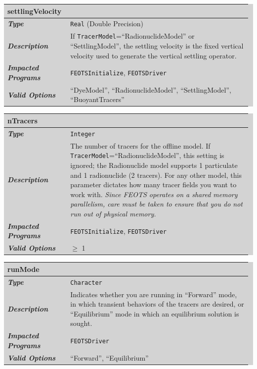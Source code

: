 \documentclass{softwaremanual}
\begin{document}
\noindent\begingroup\setlength{\fboxsep}{0pt}
\colorbox{lightgray}{
\begin{tabular}{p{0.25\linewidth} p{0.725\linewidth}}
\toprule
\textbf{settlingVelocity} & \\
\midrule
\textbf{\textit{Type}} & \texttt{Real} (Double Precision)  \\
\midrule
\textbf{\textit{Description}} & If \texttt{TracerModel}=``RadionuclideModel'' or ``SettlingModel'', the settling velocity is the fixed vertical velocity used to generate the vertical settling operator. \\
\midrule
\textbf{\textit{Impacted Programs}} & \texttt{FEOTSInitialize}, \texttt{FEOTSDriver} \\
\midrule
\textbf{\textit{Valid Options}}  & ``DyeModel'', ``RadionuclideModel'', ``SettlingModel'', ``BuoyantTracers'' \\
\bottomrule
\end{tabular}
}\endgroup


\noindent\begingroup\setlength{\fboxsep}{0pt}
\colorbox{lightgray}{
\begin{tabular}{p{0.25\linewidth} p{0.725\linewidth}}
\toprule
\textbf{nTracers} & \\
\midrule
\textbf{\textit{Type}} & \texttt{Integer} \\
\midrule
\textbf{\textit{Description}} & The number of tracers for the offline model. If \texttt{TracerModel}=``RadionuclideModel'', this setting is ignored; the Radionuclide model supports 1 particulate and 1 radionuclide (2 tracers). For any other model, this parameter dictates how many tracer fields you want to work with. \textit{Since FEOTS operates on a shared memory parallelism, care must be taken to ensure that you do not run out of physical memory.}  \\
\midrule
\textbf{\textit{Impacted Programs}} & \texttt{FEOTSInitialize}, \texttt{FEOTSDriver} \\
\midrule
\textbf{\textit{Valid Options}}  & $\geq$ 1 \\
\bottomrule
\end{tabular}
}\endgroup


\noindent\begingroup\setlength{\fboxsep}{0pt}
\colorbox{lightgray}{
\begin{tabular}{p{0.25\linewidth} p{0.725\linewidth}}
\toprule
\textbf{runMode} & \\
\midrule
\textbf{\textit{Type}} & \texttt{Character} \\
\midrule
\textbf{\textit{Description}} & Indicates whether you are running in ``Forward'' mode, in which transient behaviors of the tracers are desired, or ``Equilibrium'' mode in which an equilibrium solution is sought.  \\
\midrule
\textbf{\textit{Impacted Programs}} & \texttt{FEOTSDriver} \\
\midrule
\textbf{\textit{Valid Options}}  & ``Forward'', ``Equilibrium'' \\
\bottomrule
\end{tabular}
}\endgroup
\end{document}
